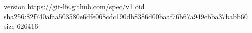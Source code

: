 version https://git-lfs.github.com/spec/v1
oid sha256:82f740afaa503580e6dfe068cdc190db8386d00baaf76b67a949cbba37babb60
size 626416
